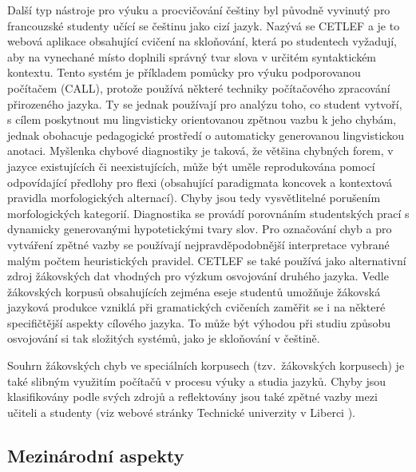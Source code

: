 \begin{multicols}{2}
Další typ nástroje pro výuku a procvičování češtiny byl původně vyvinutý pro francouzské studenty učící se češtinu jako cizí jazyk. Nazývá se CETLEF \cite{Note9} a je to webová aplikace obsahující cvičení na skloňování, která po studentech vyžadují, aby na vynechané místo doplnili správný tvar slova v určitém syntaktickém kontextu. Tento systém je příkladem pomůcky pro výuku podporovanou počítačem (CALL), protože používá některé techniky počítačového zpracování přirozeného jazyka. Ty se jednak používají pro analýzu toho, co student vytvoří, s cílem poskytnout mu lingvisticky orientovanou zpětnou vazbu k jeho chybám, jednak obohacuje pedagogické prostředí o automaticky generovanou lingvistickou anotaci. Myšlenka chybové diagnostiky je taková, že většina chybných forem, v jazyce existujících či neexistujících, může být uměle reprodukována pomocí odpovídající předlohy pro flexi (obsahující paradigmata koncovek a kontextová pravidla morfologických alternací). Chyby jsou tedy vysvětlitelné porušením morfologických kategorií. Diagnostika se provádí porovnáním studentských prací s dynamicky generovanými hypotetickými tvary slov. Pro označování chyb a pro vytváření zpětné vazby se používají nejpravděpodobnější interpretace vybrané malým počtem heuristických pravidel. CETLEF se také používá jako alternativní zdroj žákovských dat vhodných pro výzkum osvojování druhého jazyka. Vedle žákovských korpusů obsahujících zejména eseje studentů umožňuje žákovská jazyková produkce vzniklá při gramatických cvičeních zaměřit se i na některé specifičtější aspekty cílového jazyka. To může být výhodou při studiu způsobu osvojování si tak složitých systémů, jako je skloňování v češtině.

Souhrn žákovských chyb ve speciálních korpusech (tzv.~žákovských korpusech) je také slibným využitím počítačů v procesu výuky a studia jazyků. Chyby jsou klasifikovány podle svých zdrojů a reflektovány jsou také zpětné vazby mezi učiteli a studenty (viz webové stránky Technické univerzity v Liberci \cite{Note10}).

\subsection{Mezinárodní aspekty}


\end{multicols}
